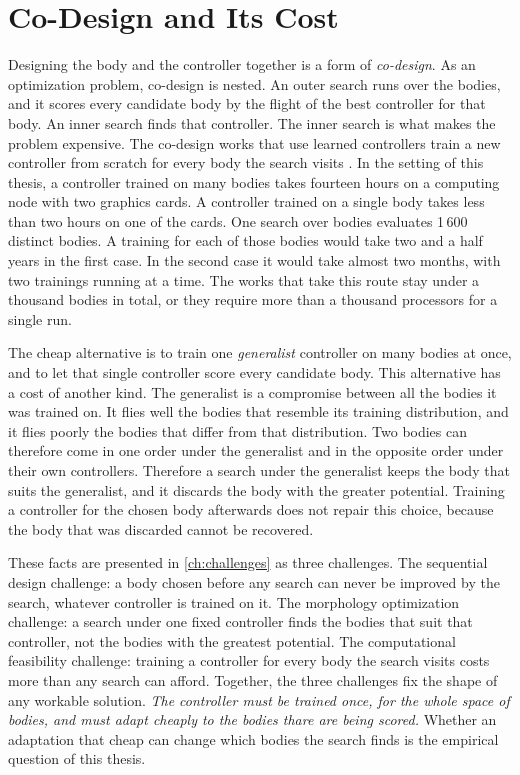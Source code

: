 \section{Co-Design and Its Cost}
\label{sec:intro-codesign}

Designing the body and the controller together is a form of \emph{co-design}. As an optimization problem, co-design is nested. An outer search runs over the bodies, and it scores every candidate body by the flight of the best controller for that body. An inner search finds that controller. The inner search is what makes the problem expensive. The co-design works that use learned controllers train a new controller from scratch for every body the search visits \cite{gupta2021embodied, muff2026hexacopters}. In the setting of this thesis, a controller trained on many bodies takes fourteen hours on a computing node with two graphics cards. A controller trained on a single body takes less than two hours on one of the cards. One search over bodies evaluates 1\,600 distinct bodies. A training for each of those bodies would take two and a half years in the first case. In the second case it would take almost two months, with two trainings running at a time. The works that take this route stay under a thousand bodies in total, or they require more than a thousand processors for a single run.

The cheap alternative is to train one \emph{generalist} controller on many bodies at once, and to let that single controller score every candidate body. This alternative has a cost of another kind. The generalist is a compromise between all the bodies it was trained on. It flies well the bodies that resemble its training distribution, and it flies poorly the bodies that differ from that distribution. Two bodies can therefore come in one order under the generalist and in the opposite order under their own controllers. Therefore a search under the generalist keeps the body that suits the generalist, and it discards the body with the greater potential. Training a controller for the chosen body afterwards does not repair this choice, because the body that was discarded cannot be recovered.

These facts are presented in \autoref{ch:challenges} as three challenges. The sequential design challenge: a body chosen before any search can never be improved by the search, whatever controller is trained on it. The morphology optimization challenge: a search under one fixed controller finds the bodies that suit that controller, not the bodies with the greatest potential. The computational feasibility challenge: training a controller for every body the search visits costs more than any search can afford. Together, the three challenges fix the shape of any workable solution. \emph{The controller must be trained once, for the whole space of bodies, and must adapt cheaply to the bodies thare are being scored.} Whether an adaptation that cheap can change which bodies the search finds is the empirical question of this thesis.

